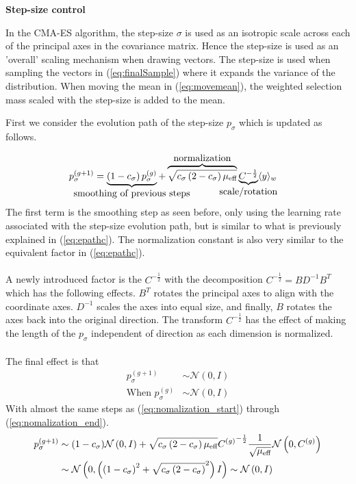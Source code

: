 \textbf{Step-size control}

In the CMA-ES algorithm, the step-size $\sigma$ is used as an isotropic scale across
each of the principal axes in the covariance matrix. Hence the step-size is used as 
an 'overall' scaling mechanism when drawing vectors. The step-size is used when 
sampling the vectors in (\ref{eq:finalSample}) where it expands the variance 
of the distribution. When moving the mean in (\ref{eq:movemean}), the weighted 
selection mass scaled with the step-size is added to the mean.

First we consider the evolution path of the step-size $p_\sigma$ which is
updated as follows.

\begin{align}
p_{\sigma}^{(g+1)} &= 
\underbrace{\left( 1 - c_{\sigma} \right) p_{\sigma}^{(g)}}_{
\makebox[0pt]{\text{{smoothing of previous steps}}}
}
+ 
\overbrace{\sqrt{c_{\sigma} \left( 2 - c_{\sigma} \right) \meff}}
^{
\makebox[0pt]{\text{{normalization}}}
} 
\underbrace{C^{- \frac{1}{2}}}_{
\makebox[0pt]{\text{{scale/rotation}}}
}
\langle y \rangle_{w}
\end{align}
The first term is the smoothing step as seen before, only using the learning rate 
associated with the step-size evolution path, but is similar to what is previously explained in
(\ref{eq:epathc}). The normalization constant is also very similar to the
equivalent factor in (\ref{eq:epathc}).\\
\\
A newly introduced factor is the $C^{-\frac{1}{2}}$ with the decomposition
$C^{-\frac{1}{2}} = B D^{-1} B^{T}$ which has the following effects. $B^{T}$
rotates the principal axes to align with the coordinate axes. 
$D^{-1}$ scales the axes into equal size, and finally, $B$ rotates the 
axes back into the original direction. The transform $C^{-\frac{1}{2}}$
has the effect of making the length of the $p_\sigma$ independent of 
direction as each dimension is normalized.\\
\\
The final effect is that
\begin{align}
p_\sigma^{(g+1)} &\sim \mathcal{N}\left(0, I \right)\\
\text{When }
p_\sigma^{(g)} &\sim \mathcal{N} \left(0, I \right)
\end{align}
With almost the same steps as (\ref{eq:nomalization_start}) through 
(\ref{eq:nomalization_end}).
\begin{align}
p_\sigma^{(g+1)} &\sim (1 - c_\sigma) \mathcal{N}\left( 0, I \right) + \sqrt{c_\sigma 
\left( 2-c_\sigma \right)\mu_{\text{eff}} } {C^{(g)}}^{-\frac{1}{2}} \frac{1}{\sqrt{\mu_{\text{eff}}}}
\mathcal{N} \left( 0, C^{(g)} \right)\\
&\sim \mathcal{N} 
\left( 
  0, 
  \left(  
    \left( 
      1-c_\sigma 
    \right)^2 + \sqrt{c_\sigma 
    \left(  
      2 - c_\sigma
    \right)}^2
  \right) I
\right) \sim \mathcal{N} \left( 0, I \right)
\end{align}

